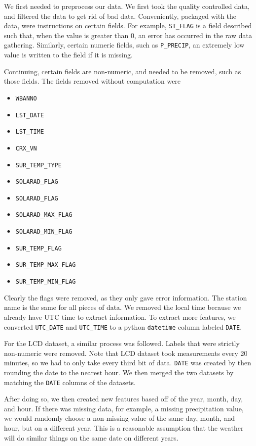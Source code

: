 \documentclass[../report.tex]{subfiles}
\begin{document}
We first needed to preprocess our data.
We first took the quality controlled data, and filtered the data to get rid of bad data.
Conveniently, packaged with the data, were instructions on certain fields.
For example, \verb|ST_FLAG| is a field described such that, when the value is greater than 0, an error has occurred in the raw data gathering.
Similarly, certain numeric fields, such as \verb|P_PRECIP|, an extremely low value is written to the field if it is missing.

Continuing, certain fields are non-numeric, and needed to be removed, such as those fields.
The fields removed without computation were

\begin{itemize}
    \item \verb|WBANNO|
    \item \verb|LST_DATE|
    \item \verb|LST_TIME|
    \item \verb|CRX_VN|
    \item \verb|SUR_TEMP_TYPE|
    \item \verb|SOLARAD_FLAG|
    \item \verb|SOLARAD_FLAG|
    \item \verb|SOLARAD_MAX_FLAG|
    \item \verb|SOLARAD_MIN_FLAG|
    \item \verb|SUR_TEMP_FLAG|
    \item \verb|SUR_TEMP_MAX_FLAG|
    \item \verb|SUR_TEMP_MIN_FLAG|
\end{itemize}
Clearly the flags were removed, as they only gave error information.
The station name is the same for all pieces of data.
We removed the local time because we already have UTC time to extract information.
To extract more features, we converted \verb|UTC_DATE| and \verb|UTC_TIME| to a python \verb|datetime| column labeled \verb|DATE|.

For the LCD dataset, a similar process was followed.
Labels that were strictly non-numeric were removed.
Note that LCD dataset took measurements every 20 minutes, so we had to only take every third bit of data.
\verb|DATE| was created by then rounding the date to the nearest hour.
We then merged the two datasets by matching the \verb|DATE| columns of the datasets.

After doing so, we then created new features based off of the year, month, day, and hour.
If there was missing data, for example, a missing precipitation value, we would randomly choose a non-missing value of the same day, month, and hour, but on a different year.
This is a reasonable assumption that the weather will do similar things on the same date on different years.
\end{document}
